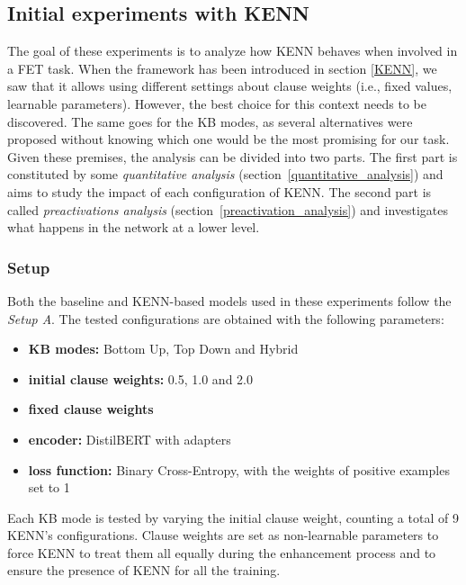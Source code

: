 \subsection{Initial experiments with KENN}
The goal of these experiments is to analyze how KENN behaves when involved in a FET task. When the framework has been introduced in section \ref{KENN}, we saw that it allows using different settings about clause weights (i.e., fixed values, learnable parameters). However, the best choice for this context needs to be discovered. The same goes for the KB modes, as several alternatives were proposed without knowing which one would be the most promising for our task. Given these premises, the analysis can be divided into two parts. The first part is constituted by some \textit{quantitative analysis} (section~\ref{quantitative_analysis}) and aims to study the impact of each configuration of KENN. The second part is called \textit{preactivations analysis} (section~\ref{preactivation_analysis}) and investigates what happens in the network at a lower level.

\subsubsection{Setup}
Both the baseline and KENN-based models used in these experiments follow the \textit{Setup A}. The tested configurations are obtained with the following parameters:
\begin{itemize}
    \item \textbf{KB modes:} Bottom Up, Top Down and Hybrid
    \item \textbf{initial clause weights:} 0.5, 1.0 and 2.0
    \item \textbf{fixed clause weights}
    \item \textbf{encoder:} DistilBERT with adapters
    \item \textbf{loss function:} Binary Cross-Entropy, with the weights of positive examples set to 1
\end{itemize}
Each KB mode is tested by varying the initial clause weight, counting a total of 9 KENN's configurations. Clause weights are set as non-learnable parameters to force KENN to treat them all equally during the enhancement process and to ensure the presence of KENN for all the training.


